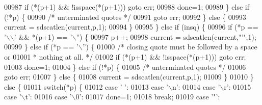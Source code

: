 \begin{DoxyCode}
{{{{{{{{{{{{{{{{00987                         \textcolor{keywordflow}{if} (*(p+1) && !isspace(*(p+1))) \textcolor{keywordflow}{goto} err;
00988                         done=1;
00989                     \} \textcolor{keywordflow}{else} \textcolor{keywordflow}{if} (!*p) \{
00990                         \textcolor{comment}{/* unterminated quotes */}
00991                         \textcolor{keywordflow}{goto} err;
00992                     \} \textcolor{keywordflow}{else} \{
00993                         current = sdscatlen(current,p,1);
00994                     \}
00995                 \} \textcolor{keywordflow}{else} \textcolor{keywordflow}{if} (insq) \{
00996                     \textcolor{keywordflow}{if} (*p == \textcolor{stringliteral}{'\(\backslash\)\(\backslash\)'} && *(p+1) == \textcolor{stringliteral}{'\(\backslash\)''}) \{
00997                         p++;
00998                         current = sdscatlen(current,\textcolor{stringliteral}{"'"},1);
00999                     \} \textcolor{keywordflow}{else} \textcolor{keywordflow}{if} (*p == \textcolor{stringliteral}{'\(\backslash\)''}) \{
01000                         \textcolor{comment}{/* closing quote must be followed by a space or}
01001 \textcolor{comment}{                         * nothing at all. */}
01002                         \textcolor{keywordflow}{if} (*(p+1) && !isspace(*(p+1))) \textcolor{keywordflow}{goto} err;
01003                         done=1;
01004                     \} \textcolor{keywordflow}{else} \textcolor{keywordflow}{if} (!*p) \{
01005                         \textcolor{comment}{/* unterminated quotes */}
01006                         \textcolor{keywordflow}{goto} err;
01007                     \} \textcolor{keywordflow}{else} \{
01008                         current = sdscatlen(current,p,1);
01009                     \}
01010                 \} \textcolor{keywordflow}{else} \{
01011                     \textcolor{keywordflow}{switch}(*p) \{
01012                     \textcolor{keywordflow}{case} \textcolor{stringliteral}{' '}:
01013                     \textcolor{keywordflow}{case} \textcolor{stringliteral}{'\(\backslash\)n'}:
01014                     \textcolor{keywordflow}{case} \textcolor{stringliteral}{'\(\backslash\)r'}:
01015                     \textcolor{keywordflow}{case} \textcolor{stringliteral}{'\(\backslash\)t'}:
01016                     \textcolor{keywordflow}{case} \textcolor{stringliteral}{'\(\backslash\)0'}:
01017                         done=1;
01018                         \textcolor{keywordflow}{break};
01019                     \textcolor{keywordflow}{case} \textcolor{stringliteral}{'"'}:
}}}}}}}}}}}}}}}}
\end{DoxyCode}
